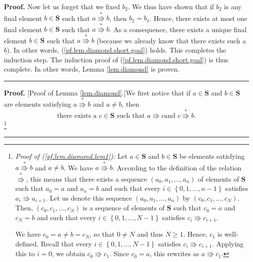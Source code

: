 \documentclass[numbers=enddot,12pt,final,onecolumn,notitlepage]{scrartcl}%
\theoremstyle{definition}
\newenvironment{proof}[1][Proof]{\noindent\textbf{#1.} }{\ \rule{0.5em}{0.5em}}
\newenvironment{verlong}{}{}
\newenvironment{vershort}{}{}
\begin{document}
\begin{vershort}
\begin{proof}
Now let us forget that we fixed $b_{2}$. We thus have shown that if $b_{2}$ is
any final element $b\in\mathbf{S}$ such that $a\overset{\ast}{\Rrightarrow}b$,
then $b_{2}=b_{1}$. Hence, there exists at most one final element
$b\in\mathbf{S}$ such that $a\overset{\ast}{\Rrightarrow}b$. As a consequence,
there exists a unique final element $b\in\mathbf{S}$ such that $a\overset{\ast
}{\Rrightarrow}b$ (because we already know that there exists such a $b$). In
other words, (\ref{pf.lem.diamond.short.goal}) holds. This completes the
induction step. The induction proof of (\ref{pf.lem.diamond.short.goal}) is
thus complete. In other words, Lemma \ref{lem.diamond} is proven.
\end{proof}
\end{vershort}

\begin{verlong}
\begin{proof}
[Proof of Lemma \ref{lem.diamond}.]We first notice that if $a\in\mathbf{S}$
and $b\in\mathbf{S}$ are elements satisfying $a\overset{\ast}{\Rrightarrow}b$
and $a\neq b$, then%
\begin{equation}
\text{there exists a }c\in\mathbf{S}\text{ such that }a\Rrightarrow c\text{
and }c\overset{\ast}{\Rrightarrow}b. \label{pf.lem.diamond.lem1}%
\end{equation}
\footnote{\textit{Proof of (\ref{pf.lem.diamond.lem1}):} Let $a\in\mathbf{S}$
and $b\in\mathbf{S}$ be elements satisfying $a\overset{\ast}{\Rrightarrow}b$
and $a\neq b$. We have $a\overset{\ast}{\Rrightarrow}b$. According to the
definition of the relation $\overset{\ast}{\Rrightarrow}$, this means that
there exists a sequence $\left(  a_{0},a_{1},\ldots,a_{n}\right)  $ of
elements of $\mathbf{S}$ such that $a_{0}=a$ and $a_{n}=b$ and such that every
$i\in\left\{  0,1,\ldots,n-1\right\}  $ satisfies $a_{i}\Rrightarrow a_{i+1}$.
Let us denote this sequence $\left(  a_{0},a_{1},\ldots,a_{n}\right)  $ by
$\left(  c_{0},c_{1},\ldots,c_{N}\right)  $. Then, $\left(  c_{0},c_{1}%
,\ldots,c_{N}\right)  $ is a sequence of elements of $\mathbf{S}$ such that
$c_{0}=a$ and $c_{N}=b$ and such that every $i\in\left\{  0,1,\ldots
,N-1\right\}  $ satisfies $c_{i}\Rrightarrow c_{i+1}$.
\par
We have $c_{0}=a\neq b=c_{N}$, so that $0\neq N$ and thus $N\geq1$. Hence,
$c_{1}$ is well-defined. Recall that every $i\in\left\{  0,1,\ldots
,N-1\right\}  $ satisfies $c_{i}\Rrightarrow c_{i+1}$. Applying this to $i=0$,
we obtain $c_{0}\Rrightarrow c_{1}$. Since $c_{0}=a$, this rewrites as
$a\Rrightarrow c_{1}$.
}
\end{proof}
\end{verlong}
\end{document}
